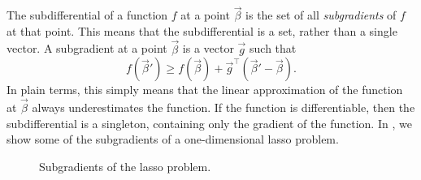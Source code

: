 The subdifferential of a function \(f\) at a point \(\vec{\beta}\) is the set of all \emph{subgradients} of \(f\) at that point. This means that the subdifferential is a set, rather than a single vector. A subgradient at a point \(\vec{\beta}\) is a vector \(\vec{g}\) such that
\[
  f(\vec{\beta}') \geq f(\vec{\beta}) + \vec{g}^\intercal (\vec{\beta}' - \vec{\beta}).
\]
In plain terms, this simply means that the linear approximation of the function at \(\vec{\beta}\) always underestimates the function. If the function is differentiable, then the subdifferential is a singleton, containing only the gradient of the function.
In , we show some of the subgradients of a one-dimensional lasso problem.

\begin{figure}[htpb]
  \centering
  \hfill%
  \hfill%
  \caption{%
    Subgradients of the lasso problem.
  }
\end{figure}

